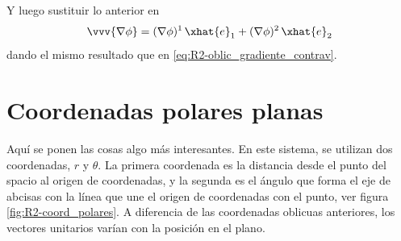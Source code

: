 {\small
Y luego sustituir lo anterior en
\begin{equation}
  \vvv{\nabla\phi} = (\nabla\phi)^1\,\xhat{e}_1 + (\nabla\phi)^2\,\xhat{e}_2
\end{equation}
dando el mismo resultado que en \eqref{eq:R2-oblic_gradiente_contrav}.
}

%
\section{Coordenadas polares planas}
Aquí se ponen las cosas algo más interesantes. En este sistema, se utilizan dos
coordenadas, $r$ y $\theta$. La primera coordenada es la distancia desde el punto del spacio al origen de coordenadas, y la segunda es el ángulo que forma el eje de abcisas
con la línea que une el origen de coordenadas con el punto, ver figura
\ref{fig:R2-coord_polares}. A diferencia de las coordenadas oblicuas anteriores, los
vectores unitarios varían con la posición en el plano.

